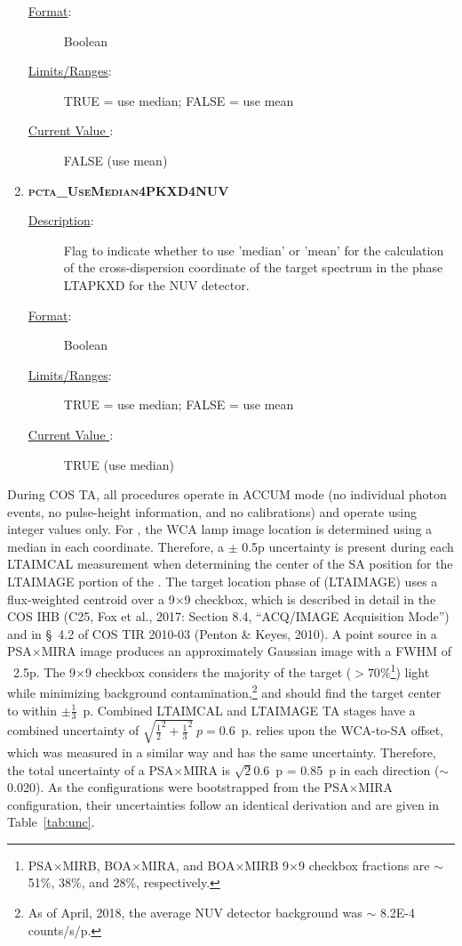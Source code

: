 \begin{enumerate}
\begin{description}
	\item[\underline{\rm Format}:]    Boolean
	\item[\underline{\rm Limits/Ranges}:]  TRUE = use median;  FALSE = use mean
	\item[\underline{\rm Current Value }:]   FALSE (use mean)
\end{description}
\item{\textsc{\bf pcta\_UseMedian4PKXD4NUV}}
	\begin{description}
	\item[\underline{\rm Description}:]Flag to indicate whether to use 'median' or 'mean' for the calculation of the cross-dispersion coordinate of the target spectrum in the phase \textsc{LTAPKXD} for the NUV detector.
	\item[\underline{\rm Format}:]    Boolean
	\item[\underline{\rm Limits/Ranges}:]  TRUE = use median;  FALSE = use mean
	\item[\underline{\rm Current Value }:]   TRUE (use median)
\end{description}
\end{enumerate}
\normalsize

During COS TA, all \tacq{} procedures operate in ACCUM mode (no individual photon events, no pulse-height information, and no calibrations) and operate using integer values only.
For , the WCA lamp image location is determined using a median in each coordinate. Therefore, a $\pm$ 0.5p uncertainty is present during each \textsc{LTAIMCAL} measurement when determining the center of the SA position for the
\textsc{LTAIMAGE} portion of the . The target location phase of  (\textsc{LTAIMAGE}) uses a flux-weighted centroid over a 9$\times$9 checkbox, which is described in detail in the COS IHB (C25, Fox et al., 2017: Section 8.4, ``ACQ/IMAGE Acquisition Mode'') and in \S~4.2
of COS TIR 2010-03 (Penton \& Keyes, 2010). A point source in a PSA$\times$MIRA image produces an approximately Gaussian image with a FWHM of ~2.5p.
The 9$\times$9 checkbox considers the majority of the target ($>70\%$\footnote{PSA$\times$MIRB, BOA$\times$MIRA, and BOA$\times$MIRB 9$\times$9 checkbox fractions are $\sim$ 51\%, 38\%, and 28\%, respectively.})
light while minimizing background contamination,\footnote{As of April, 2018, the average NUV detector background was $\sim$ 8.2E-4 counts/s/p.} and should find the target center to within $\pm \frac{1}{3}$~p.
Combined \textsc{LTAIMCAL} and \textsc{LTAIMAGE} TA stages have a combined uncertainty of $\sqrt{\frac{1}{2}^2 + \frac{1}{3}^2}~p = 0.6$~p.
 relies upon the WCA-to-SA offset, which was measured in a similar way and has the same uncertainty. Therefore, the total uncertainty
of a PSA$\times$MIRA  is $\sqrt{2} 0.6$~p = 0.85~p in each direction ($\sim$0.020\arcsec). As the
 configurations were bootstrapped from the PSA$\times$MIRA configuration, their uncertainties follow an identical derivation and
are given in Table~\ref{tab:unc}.

